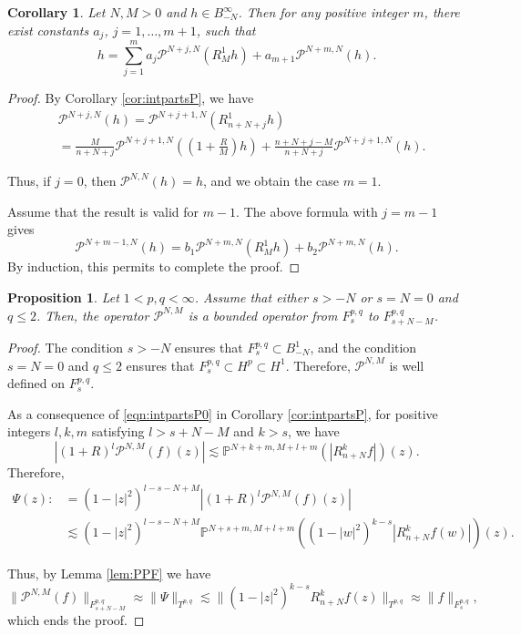 \documentclass[12pt,twoside,leqno,final]{amsart}
\theoremstyle{plain}
\newtheorem{prop}[thm]{Proposition}
\newtheorem{cor}[thm]{Corollary}
\begin{document}
\begin{cor}\label{cor:RkvPN}
Let  $N,M>0$ and  $h\in B^\infty_{-N}$.
Then for any positive integer $m$, there exist constants $a_j$, $j=1,\dots,m+1$, such that 
\begin{equation}\label{eqn:RkvPN1}
h= \sum_{j=1}^m a_j{{\mathcal P}}^{N+j,N}(R^1_M h)+a_{m+1}{{\mathcal P}}^{N+m,N}(h).
\end{equation}
\end{cor}

\begin{proof}
By Corollary \ref{cor:intpartsP}, we have
\begin{align*}
&{{\mathcal P}}^{N+j,N}(h)={{\mathcal P}}^{N+j+1,N}(R^1_{n+N+j}h)\\
&=\frac{M}{n+N+j}{{\mathcal P}}^{N+j+1,N}\left(\left(1+\frac{R}{M}\right)h\right)+\frac{n+N+j-M}{n+N+j}{{\mathcal P}}^{N+j+1,N}(h).
\end{align*}

Thus, if $j=0$, then ${{\mathcal P}}^{N,N}(h)=h$, and we obtain the case $m=1$.

Assume that the result is valid for $m-1$. The above formula with $j=m-1$ gives 
$$
{{\mathcal P}}^{N+m-1,N}(h)
=b_1{{\mathcal P}}^{N+m,N}(R^1_Mh)+b_2{{\mathcal P}}^{N+m,N}(h).
$$
By induction, this permits to complete the proof.
\end{proof}

\begin{prop}\label{prop:PNMonF}
Let $1<p,q<\infty$. Assume that either $s>-N$ or $s=N=0$ and $q\le 2$. 
Then, the operator ${{\mathcal P}}^{N,M}$ is a bounded operator from 
$F^{p,q}_s$ to $F^{p,q}_{s+N-M}$.
\end{prop}

\begin{proof}
The condition $s>-N$ ensures that $F^{p,q}_s\subset B^1_{-N}$, and the condition $s= N=0$ and $q\le 2$
 ensures that $F^{p,q}_s\subset H^p\subset H^1$. Therefore, ${{\mathcal P}}^{N,M}$ is well defined on $F^{p,q}_s$.

As a consequence of \eqref{eqn:intpartsP0} in Corollary \ref{cor:intpartsP}, 
for positive integers $l,k,m$ satisfying $l>s+N-M$ and $k>s$, we have
\begin{equation}\label{eqn:intpartsP}
|(1+R)^l{{\mathcal P}}^{N,M}(f)(z)|\lesssim {\mathbb{P}}^{N+k+m,M+l+m} (|R^k_{n+N}f|)(z).
\end{equation}
Therefore, 
\begin{align*}
\Psi(z):&=(1-|z|^2)^{l-s-N+M}|(1+R)^l{{\mathcal P}}^{N,M}(f)(z)|\\
&\lesssim (1-|z|^2)^{l-s-N+M}{\mathbb{P}}^{N+s+m,M+l+m} ((1-|w|^2)^{k-s}|R^k_{n+N}f(w)|)(z).
\end{align*}

Thus, by Lemma \ref{lem:PPF} we have 
$$
\|{{\mathcal P}}^{N,M}(f)\|_{F^{p,q}_{s+N-M}}\approx \|\Psi\|_{T^{p,q}}
\lesssim  \|(1-|z|^2)^{k-s}R^k_{n+N}f(z)\|_{T^{p,q}}\approx \|f\|_{F^{p,q}_s},
$$
which ends the proof.
\end{proof}
\end{document}
